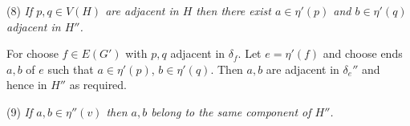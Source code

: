 \hspace*{12pt}(8) \textit{If $p, q \in V(H)$ are adjacent in $H$ then there exist $a \in \eta'(p)$ and $b \in \eta'(q)$ adjacent in $H''$.}

For choose $f \in E(G')$ with $p, q$ adjacent in $\delta_f$. Let $e = \eta'(f)$ and choose ends $a, b$ of $e$ such that $a \in \eta'(p)$, $b \in \eta'(q)$. Then $a, b$ are adjacent in $\delta_e''$ and hence in $H''$ as required.

\hspace*{12pt}(9) \textit{If $a, b \in \eta''(v)$ then $a, b$ belong to the same component of $H''$.}
